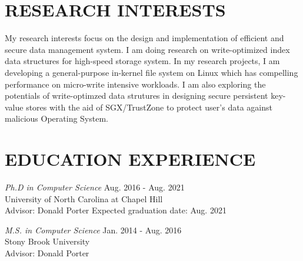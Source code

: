 \documentclass[margin, 10pt]{res} %
\begin{document}
\begin{resume}


 
\section{RESEARCH INTERESTS}  
My research interests focus on the design and implementation of efficient and secure data management system.
I am doing research on write-optimized index data structures for high-speed storage system.
In my research projects, I am developing a general-purpose in-kernel file system on Linux which has
compelling performance on micro-write intensive workloads.
I am also exploring the potentials of write-optimzed data strutures in designing
secure persistent key-value stores with the aid of SGX/TrustZone to protect user's data
against malicious Operating System.

%

\section{EDUCATION EXPERIENCE} 

{\sl Ph.D in Computer Science} \hfill Aug. 2016 - Aug. 2021 \\
University of North Carolina at Chapel Hill \\
Advisor: Donald Porter
Expected graduation date: Aug. 2021

{\sl M.S. in Computer Science} \hfill Jan. 2014 - Aug. 2016 \\
Stony Brook University \\
Advisor: Donald Porter


\end{resume}
\end{document}
